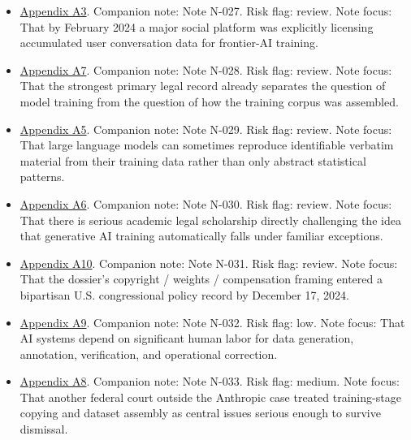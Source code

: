 \documentclass[
  american,
  11pt,
  letterpaper,
]{article}
\providecommand{\tightlist}{%
  \setlength{\itemsep}{0pt}\setlength{\parskip}{0pt}}
\begin{document}
\begin{itemize}
\tightlist
\item
  \hyperref[appendix-a3-reddit-strikes-60m-deal-allowing-google-to-train-ai-models-on-its-posts-unveils-ipo-plans]{Appendix
  A3}. Companion note: Note N-027. Risk flag: review. Note focus: That
  by February 2024 a major social platform was explicitly licensing
  accumulated user conversation data for frontier-AI training.
\item
  \hyperref[appendix-a7-bartz-et-al-v-anthropic-pbc-order-on-fair-use]{Appendix
  A7}. Companion note: Note N-028. Risk flag: review. Note focus: That
  the strongest primary legal record already separates the question of
  model training from the question of how the training corpus was
  assembled.
\item
  \hyperref[appendix-a5-extracting-training-data-from-large-language-models]{Appendix
  A5}. Companion note: Note N-029. Risk flag: review. Note focus: That
  large language models can sometimes reproduce identifiable verbatim
  material from their training data rather than only abstract
  statistical patterns.
\item
  \hyperref[appendix-a6-generative-ai-training-and-copyright-law]{Appendix
  A6}. Companion note: Note N-030. Risk flag: review. Note focus: That
  there is serious academic legal scholarship directly challenging the
  idea that generative AI training automatically falls under familiar
  exceptions.
\item
  \hyperref[appendix-a10-bipartisan-house-task-force-report-on-artificial-intelligence]{Appendix
  A10}. Companion note: Note N-031. Risk flag: review. Note focus: That
  the dossier's copyright / weights / compensation framing entered a
  bipartisan U.S. congressional policy record by December 17, 2024.
\item
  \hyperref[appendix-a9-the-problem-with-annotation-human-labour-and-outsourcing-between-france-and-madagascar]{Appendix
  A9}. Companion note: Note N-032. Risk flag: low. Note focus: That AI
  systems depend on significant human labor for data generation,
  annotation, verification, and operational correction.
\item
  \hyperref[appendix-a8-the-new-york-times-company-v-microsoft-corporation-et-al-opinion-on-motions-to-dismiss]{Appendix
  A8}. Companion note: Note N-033. Risk flag: medium. Note focus: That
  another federal court outside the Anthropic case treated
  training-stage copying and dataset assembly as central issues serious
  enough to survive dismissal.

\end{itemize}
\end{document}
